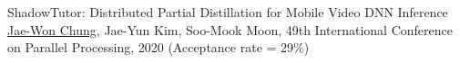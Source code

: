 



\begin{cvlist}

  \cvlistitem
    {ShadowTutor: Distributed Partial Distillation for Mobile Video DNN Inference} %
    {\underline{Jae-Won Chung}, Jae-Yun Kim, Soo-Mook Moon, 49th International Conference on Parallel Processing, 2020 (Acceptance rate = 29\%)} %

\end{cvlist}
